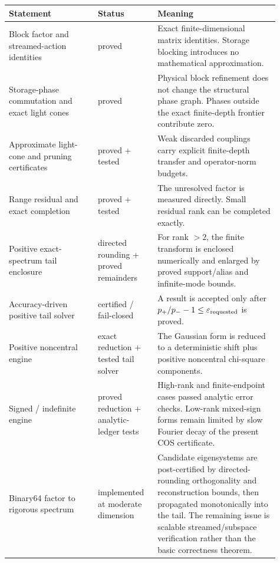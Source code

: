 \begin{center}
\small
\begin{tabular}{@{}P{0.30\linewidth}P{0.20\linewidth}P{0.41\linewidth}@{}}
\toprule
Statement & Status & Meaning\\
\midrule
Block factor and streamed-action identities &
proved &
Exact finite-dimensional matrix identities. Storage blocking introduces no
mathematical approximation.\\

Storage-phase commutation and exact light cones &
proved &
Physical block refinement does not change the structural phase graph. Phases
outside the exact finite-depth frontier contribute zero.\\

Approximate light-cone and pruning certificates &
proved + tested &
Weak discarded couplings carry explicit finite-depth transfer and
operator-norm budgets.\\

Range residual and exact completion &
proved + tested &
The unresolved factor is measured directly. Small residual rank can be
completed exactly.\\

Positive exact-spectrum tail enclosure &
directed rounding + proved remainders &
For rank \(>2\), the finite transform is enclosed numerically and enlarged by
proved support/alias and infinite-mode bounds.\\

Accuracy-driven positive tail solver &
certified / fail-closed &
A result is accepted only after
\(p_+/p_- - 1\le\varepsilon_{\rm requested}\) is proved.\\

Positive noncentral engine &
exact reduction + tested tail solver &
The Gaussian form is reduced to a deterministic shift plus positive
noncentral chi-square components.\\

Signed / indefinite engine &
proved reduction + analytic-ledger tests &
High-rank and finite-endpoint cases passed analytic error checks. Low-rank mixed-sign forms
remain limited by slow Fourier decay of the present COS certificate.\\

Binary64 factor to rigorous spectrum &
implemented at moderate dimension &
Candidate eigensystems are post-certified by directed-rounding orthogonality
and reconstruction bounds, then propagated monotonically into the tail.  The
remaining issue is scalable streamed/subspace verification rather than the
basic correctness theorem.\\
\bottomrule
\end{tabular}
\end{center}

